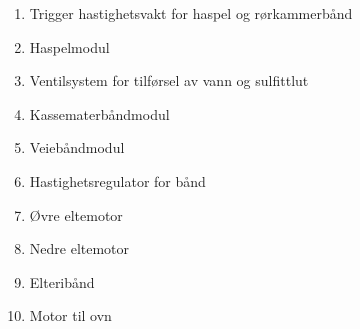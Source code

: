 \begin{enumerate}
  \item Trigger hastighetsvakt for haspel og rørkammerbånd
  \item Haspelmodul
  \item Ventilsystem for tilførsel av vann og sulfittlut
  \item Kassematerbåndmodul
  \item Veiebåndmodul
  \item Hastighetsregulator for bånd
  \item Øvre eltemotor
  \item Nedre eltemotor
  \item Elteribånd
  \item Motor til ovn
\end{enumerate}
